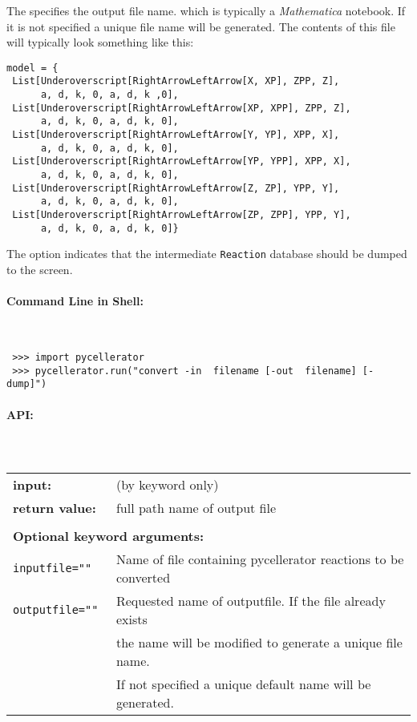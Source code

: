 The  specifies the output file name. which is typically a \textit{Mathematica} notebook. If it is not specified a unique file name will be generated. The contents of this file will typically look something like this: 
\begin{lstlisting}
model = {
 List[Underoverscript[RightArrowLeftArrow[X, XP], ZPP, Z],
      a, d, k, 0, a, d, k ,0],
 List[Underoverscript[RightArrowLeftArrow[XP, XPP], ZPP, Z],
      a, d, k, 0, a, d, k, 0],
 List[Underoverscript[RightArrowLeftArrow[Y, YP], XPP, X], 
      a, d, k, 0, a, d, k, 0],
 List[Underoverscript[RightArrowLeftArrow[YP, YPP], XPP, X],
      a, d, k, 0, a, d, k, 0],
 List[Underoverscript[RightArrowLeftArrow[Z, ZP], YPP, Y], 
      a, d, k, 0, a, d, k, 0],
 List[Underoverscript[RightArrowLeftArrow[ZP, ZPP], YPP, Y],
      a, d, k, 0, a, d, k, 0]}
\end{lstlisting}

The  option indicates that the intermediate {\tt Reaction} database should be dumped to the screen. 

\newpage

\paragraph{Command Line in Shell:}\ 

\begin{lstlisting}
 >>> import pycellerator
 >>> pycellerator.run("convert -in  filename [-out  filename] [-dump]")
\end{lstlisting}

\paragraph{API:\\}

\subparagraph{\\}

\begin{tabular}{ll}
\textbf{input:} & (by keyword only)\\
\textbf{return value:}& full path name of output file \\  \\
\multicolumn{2}{l}{\textbf{Optional keyword arguments:}}\\
\tt{inputfile=""} & Name of file containing pycellerator reactions to be converted\\
\tt{outputfile=""} & Requested name of outputfile. If the file already exists \\
& the name will be modified to generate a unique file name. \\
& If not specified a unique default name will be generated.
\end{tabular}

